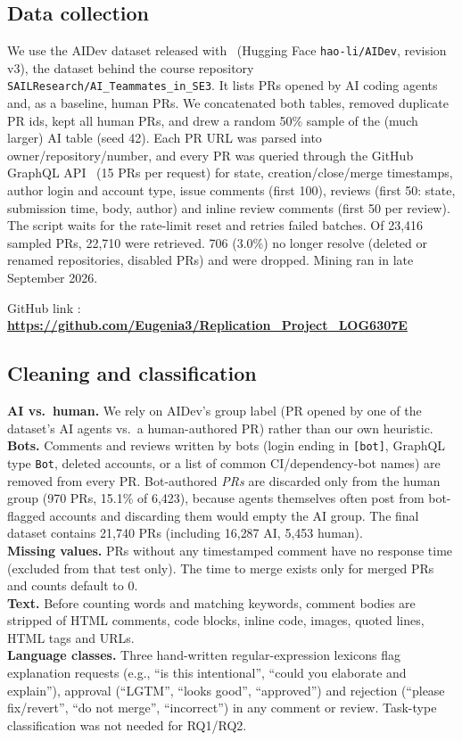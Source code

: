 \documentclass[conference]{IEEEtran}
\begin{document}
\subsection{Data collection}
We use the AIDev dataset released with~\cite{li2025rise} (Hugging Face \texttt{hao-li/AIDev}, revision v3), the dataset behind the course repository \texttt{SAILResearch/AI\_Teammates\_in\_SE3}. It lists PRs opened by AI coding agents and, as a baseline, human PRs. We concatenated both tables, removed duplicate PR ids, kept all human PRs, and drew a random 50\% sample of the (much larger) AI table (seed 42). Each PR URL was parsed into owner/repository/number, and every PR was queried through the GitHub GraphQL API~\cite{githubgql} (15 PRs per request) for state, creation/close/merge timestamps, author login and account type, issue comments (first 100), reviews (first 50: state, submission time, body, author) and inline review comments (first 50 per review). The script waits for the rate-limit reset and retries failed batches. Of 23{,}416 sampled PRs, 22{,}710 were retrieved. 706 (3.0\%) no longer resolve (deleted or renamed repositories, disabled PRs) and were dropped. Mining ran in late September 2026.

GitHub link :
\textbf{\url{https://github.com/Eugenia3/Replication_Project_LOG6307E}}

\subsection{Cleaning and classification}
\textbf{AI vs.\ human.} We rely on AIDev's group label (PR opened by one of the dataset's AI agents vs.\ a human-authored PR) rather than our own heuristic. \\
\textbf{Bots.} Comments and reviews written by bots (login ending in \texttt{[bot]}, GraphQL type \texttt{Bot}, deleted accounts, or a list of common CI/dependency-bot names) are removed from every PR. Bot-authored \emph{PRs} are discarded only from the human group (970 PRs, 15.1\% of 6{,}423), because agents themselves often post from bot-flagged accounts and discarding them would empty the AI group. The final dataset contains 21{,}740 PRs (including 16{,}287 AI, 5{,}453 human). \\
\textbf{Missing values.} PRs without any timestamped comment have no response time (excluded from that test only). The time to merge exists only for merged PRs and counts default to 0. \\
\textbf{Text.} Before counting words and matching keywords, comment bodies are stripped of HTML comments, code blocks, inline code, images, quoted lines, HTML tags and URLs. \\
\textbf{Language classes.} Three hand-written regular-expression lexicons flag explanation requests (e.g., ``is this intentional'', ``could you elaborate and explain''), approval (``LGTM'', ``looks good'', ``approved'') and rejection (``please fix/revert'', ``do not merge'', ``incorrect'') in any comment or review. Task-type classification was not needed for RQ1/RQ2.
\end{document}
